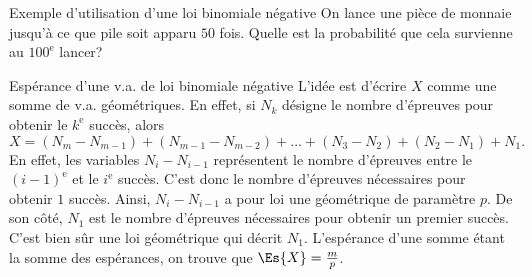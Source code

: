 \documentclass[nuit,charter,pied]{BeamerJS}
\begin{document}
\begin{frame}[t]{Exemple d'utilisation d'une loi binomiale négative}
	On lance une pièce de monnaie jusqu'à ce que pile soit apparu $50$ fois. Quelle est la probabilité que cela survienne au $100^{\text{e}}$ lancer?
\end{frame}
\begin{frame}[t]{Espérance d'une v.a. de loi binomiale négative}
	L'idée est d'écrire $X$ comme une somme de v.a. géométriques. En effet, si $N_k$ désigne le nombre d'épreuves pour obtenir le $k^{\text{e}}$ succès, alors
	\[X=(N_m-N_{m-1})+(N_{m-1}-N_{m-2})+\ldots+(N_3-N_2)+(N_2-N_1)+N_1.\]
	En effet, les variables $N_{i}-N_{i-1}$ représentent le nombre d'épreuves entre le $(i-1)^{\text{e}}$ et le $i^{\text{e}}$ succès. C'est donc le nombre d'épreuves nécessaires pour obtenir $1$ succès. Ainsi, $N_{i}-N_{i-1}$ a pour loi une géométrique de paramètre $p$. De son côté, $N_1$ est le nombre d'épreuves nécessaires pour obtenir un premier succès. C'est bien sûr une loi géométrique qui décrit $N_1$. L'espérance d'une somme étant la somme des espérances, on trouve que $\Es{X}=\frac{m}{p}$. 
\end{frame}
	
\end{document}
